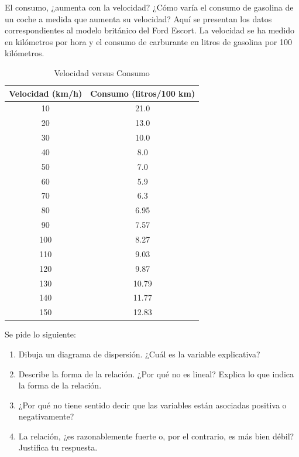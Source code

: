 \documentclass[11pt,evaluacion]{uescimat}
\begin{document}
\begin{problema}
El consumo, ¿aumenta con la velocidad? ¿Cómo varía el consumo de gasolina de un coche a medida que aumenta su velocidad? Aquí se presentan los datos correspondientes al modelo británico del Ford Escort. La velocidad se ha medido en kilómetros por hora y el consumo de carburante en litros de gasolina por 100 kilómetros. 

\begin{table}[H]
\begin{centering}
\begin{tabular}{|c|c|}
\hline 
Velocidad (km/h) & Consumo (litros/100 km)\tabularnewline
\hline 
\hline 
10 & 21.0\tabularnewline
\hline 
20 & 13.0\tabularnewline
\hline 
30 & 10.0\tabularnewline
\hline 
40 & 8.0\tabularnewline
\hline 
50 & 7.0\tabularnewline
\hline 
60 & 5.9\tabularnewline
\hline 
70 & 6.3\tabularnewline
\hline 
80 & 6.95\tabularnewline
\hline 
90 & 7.57\tabularnewline
\hline 
100 & 8.27\tabularnewline
\hline 
110 & 9.03\tabularnewline
\hline 
120 & 9.87\tabularnewline
\hline 
130 & 10.79\tabularnewline
\hline 
140 & 11.77\tabularnewline
\hline 
150 & 12.83\tabularnewline
\hline 
\end{tabular}
\par\end{centering}
\caption{Velocidad versus Consumo}

\end{table}


Se pide lo siguiente: 

\begin{enumerate}[label=(\alph*)]
\item Dibuja un diagrama de dispersión. ¿Cuál es la variable explicativa?
\item Describe la forma de la relación. ¿Por qué no es lineal? Explica lo que
indica la forma de la relación.
\item ¿Por qué no tiene sentido decir que las variables están asociadas positiva
o negativamente?
\item La relación, ¿es razonablemente fuerte o, por el contrario, es más bien
débil? Justifica tu respuesta.
\end{enumerate}




\end{problema}
\end{document}
